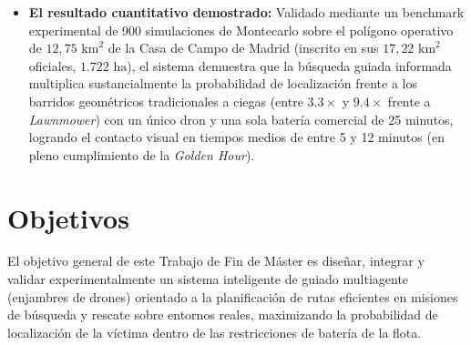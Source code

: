 \begin{itemize}
    \item \textbf{El resultado cuantitativo demostrado:} Validado mediante un benchmark experimental de 900 simulaciones de Montecarlo sobre el polígono operativo de $12{,}75\text{ km}^2$ de la Casa de Campo de Madrid (inscrito en sus $17{,}22\text{ km}^2$ oficiales, $1.722\text{ ha}$), el sistema demuestra que la búsqueda guiada informada multiplica sustancialmente la probabilidad de localización frente a los barridos geométricos tradicionales a ciegas (entre $3.3\times$ y $9.4\times$ frente a \textit{Lawnmower}) con un único dron y una sola batería comercial de 25 minutos, logrando el contacto visual en tiempos medios de entre 5 y 12 minutos (en pleno cumplimiento de la \textit{Golden Hour}).
\end{itemize}

\section{Objetivos}
El objetivo general de este Trabajo de Fin de Máster es diseñar, integrar y validar experimentalmente un sistema inteligente de guiado multiagente (enjambres de drones) orientado a la planificación de rutas eficientes en misiones de búsqueda y rescate sobre entornos reales, maximizando la probabilidad de localización de la víctima dentro de las restricciones de batería de la flota.

